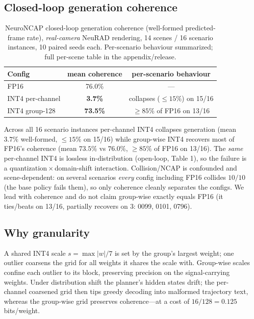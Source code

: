 \documentclass[conference]{IEEEtran}
\begin{document}
\subsection{Closed-loop generation coherence}
\begin{table}[t]\centering
\caption{NeuroNCAP closed-loop generation coherence (well-formed predicted-frame rate),
\emph{real-camera} NeuRAD rendering, 14 scenes / 16 scenario instances, 10 paired seeds each.
Per-scenario behaviour summarized; full per-scene table in the appendix/release.}
\begin{tabular}{lcc}
\toprule
Config & mean coherence & per-scenario behaviour \\
\midrule
FP16              & 76.0\%          & --- \\
INT4 per-channel  & \textbf{3.7\%}  & collapses ($\le 15\%$) on 15/16 \\
INT4 group-128    & \textbf{73.5\%} & $\ge 85\%$ of FP16 on 13/16 \\
\bottomrule
\end{tabular}
\end{table}
Across all 16 scenario instances per-channel INT4 collapses generation (mean $3.7\%$ well-formed,
$\le 15\%$ on 15/16) while group-wise INT4 recovers most of FP16's coherence (mean $73.5\%$ vs
$76.0\%$, $\ge 85\%$ of FP16 on 13/16). The \emph{same} per-channel INT4 is lossless in-distribution
(open-loop, Table 1), so the failure is a quantization\,$\times$\,domain-shift interaction.
Collision/NCAP is confounded and scene-dependent: on several scenarios \emph{every} config including
FP16 collides $10/10$ (the base policy fails them), so only coherence cleanly separates the configs.
We lead with coherence and do not claim group-wise exactly equals FP16 (it ties/beats on 13/16,
partially recovers on 3: 0099, 0101, 0796).

\subsection{Why granularity}
A shared INT4 scale $s=\max|w|/7$ is set by the group's largest weight; one outlier coarsens the
grid for all weights it shares the scale with. Group-wise scales confine each outlier to its block,
preserving precision on the signal-carrying weights. Under distribution shift the planner's hidden
states drift; the per-channel coarsened grid then tips greedy decoding into malformed trajectory
text, whereas the group-wise grid preserves coherence---at a cost of $16/128=0.125$ bits/weight.
\end{document}
